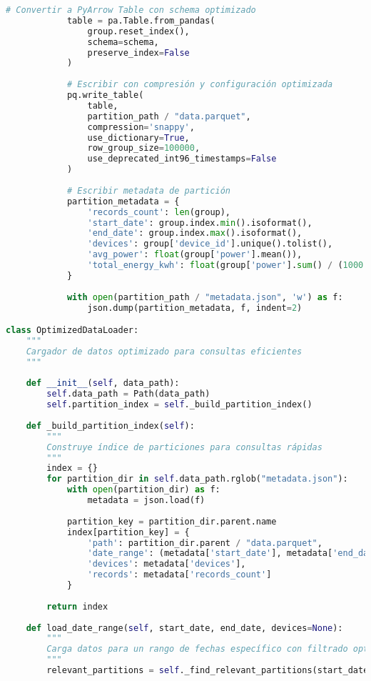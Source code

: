 \begin{lstlisting}[language=Python, caption=Sistema de particionamiento temporal]
            # Convertir a PyArrow Table con schema optimizado
            table = pa.Table.from_pandas(
                group.reset_index(), 
                schema=schema,
                preserve_index=False
            )
            
            # Escribir con compresión y configuración optimizada
            pq.write_table(
                table,
                partition_path / "data.parquet",
                compression='snappy',
                use_dictionary=True,
                row_group_size=100000,
                use_deprecated_int96_timestamps=False
            )
            
            # Escribir metadata de partición
            partition_metadata = {
                'records_count': len(group),
                'start_date': group.index.min().isoformat(),
                'end_date': group.index.max().isoformat(),
                'devices': group['device_id'].unique().tolist(),
                'avg_power': float(group['power'].mean()),
                'total_energy_kwh': float(group['power'].sum() / (1000 * 6 * 60))  # 6s intervals
            }
            
            with open(partition_path / "metadata.json", 'w') as f:
                json.dump(partition_metadata, f, indent=2)

class OptimizedDataLoader:
    """
    Cargador de datos optimizado para consultas eficientes
    """
    
    def __init__(self, data_path):
        self.data_path = Path(data_path)
        self.partition_index = self._build_partition_index()
    
    def _build_partition_index(self):
        """
        Construye índice de particiones para consultas rápidas
        """
        index = {}
        for partition_dir in self.data_path.rglob("metadata.json"):
            with open(partition_dir) as f:
                metadata = json.load(f)
            
            partition_key = partition_dir.parent.name
            index[partition_key] = {
                'path': partition_dir.parent / "data.parquet",
                'date_range': (metadata['start_date'], metadata['end_date']),
                'devices': metadata['devices'],
                'records': metadata['records_count']
            }
        
        return index
    
    def load_date_range(self, start_date, end_date, devices=None):
        """
        Carga datos para un rango de fechas específico con filtrado optimizado
        """
        relevant_partitions = self._find_relevant_partitions(start_date, end_date)
        

\end{lstlisting}
